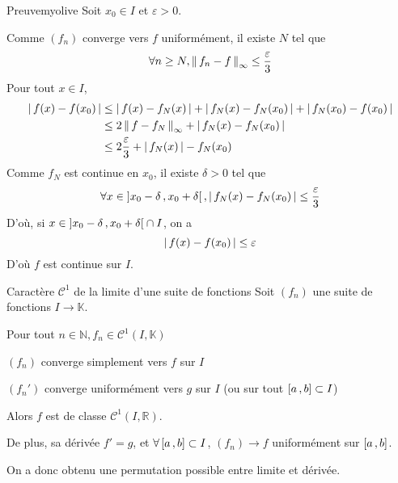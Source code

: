     \begin{demo}{Preuve}{myolive}
        Soit $x_0 \in I$ et $\varepsilon > 0$.

        Comme $(f_n)$ converge vers $f$ uniformément, il existe $N$ tel que 
        \[ \forall n \geq N, \left\lVert\,f_n - f\,\right\rVert_{\infty} \leq \frac{\varepsilon}{3} \] 
        Pour tout $x \in I$,
        \begin{align*}
            \left\lvert \,f(x) - f(x_0) \, \right\rvert 
            &\leq \left\lvert \,f(x) - f_N(x) \, \right\rvert + \left\lvert \,f_N(x) - f_N(x_0) \, \right\rvert + \left\lvert \,f_N(x_0) - f(x_0) \, \right\rvert \\
            &\leq 2 \left\lVert\,f - f_N\,\right\rVert_{\infty} + \left\lvert \,f_N(x) - f_N(x_0) \, \right\rvert \\
            &\leq 2 \frac{\varepsilon}{3} + \left\lvert \,f_N(x) \, \right\rvert - f_N(x_0)
        \end{align*}
        Comme $f_N$ est continue en $x_0$, il existe $\delta > 0$ tel que 
        \[ \forall x \in \left] x_0 - \delta \, , x_0 + \delta \right[, \left\lvert \,f_N(x) - f_N(x_0) \, \right\rvert \leq \frac{\varepsilon}{3} \]   
        D’où, si $x \in \left] x_0 - \delta \, , x_0 + \delta \right[ \cap I$, on a 
        \[ \left\lvert \,f(x) - f(x_0) \, \right\rvert \leq \varepsilon \] 
        D’où $f$ est continue sur $I$.
    \end{demo}

    \begin{prop}{Caractère $\mathcal{C}^1$ de la limite d’une suite de fonctions}{}
        Soit $(f_n)$ une suite de fonctions $I \rightarrow \mathbb{K}$. 
        \begin{suppose}
            \item Pour tout $n \in \mathbb{N}, f_n \in \mathcal{C}^1(I,\mathbb{K})$
            \item $(f_n)$ converge simplement vers $f$ sur $I$
            \item $(f_n')$ converge uniformément vers $g$ sur $I$ (ou sur tout $\left[ a \, , b \right] \subset I$)
        \end{suppose}
        Alors $f$ est de classe $\mathcal{C}^1(I,\mathbb{R})$.

        De plus, sa dérivée $f' = g$, et $\forall \left[ a \, , b \right] \subset I$, $(f_n) \rightarrow f$ uniformément sur $\left[ a \, , b \right]$.

        On a donc obtenu une permutation possible entre limite et dérivée.
    \end{prop}

